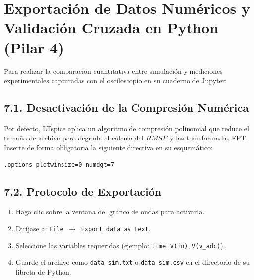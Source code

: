 \documentclass[11pt, a4paper]{article}
\begin{document}
\newpage
\section{Exportación de Datos Numéricos y Validación Cruzada en Python (Pilar 4)}
Para realizar la comparación cuantitativa entre simulación y mediciones experimentales capturadas con el osciloscopio en su cuaderno de Jupyter:

\subsection{7.1. Desactivación de la Compresión Numérica}
Por defecto, LTspice aplica un algoritmo de compresión polinomial que reduce el tamaño de archivo pero degrada el cálculo del $RMSE$ y las transformadas FFT. Inserte de forma obligatoria la siguiente directiva en su esquemático:
\begin{lstlisting}[style=spicestyle]
.options plotwinsize=0 numdgt=7
\end{lstlisting}

\subsection{7.2. Protocolo de Exportación}
\begin{enumerate}
    \item Haga clic sobre la ventana del gráfico de ondas para activarla.
    \item Diríjase a: \texttt{File $\longrightarrow$ Export data as text}.
    \item Seleccione las variables requeridas (ejemplo: \texttt{time}, \texttt{V(in)}, \texttt{V(v\_adc)}).
    \item Guarde el archivo como \texttt{data\_sim.txt} o \texttt{data\_sim.csv} en el directorio de su libreta de Python.
\end{enumerate}
\end{document}
